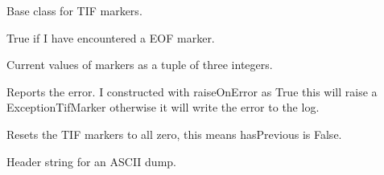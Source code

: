 \documentclass[letterpaper,10pt,english]{sphinxmanual}
\begin{document}
\begin{fulllineitems}
\label{\detokenize{ref/LIS/core/TifMarker:TotalDepth.LIS.core.TifMarker.TifMarkerBase}}
Base class for TIF markers.

\begin{fulllineitems}
\label{\detokenize{ref/LIS/core/TifMarker:TotalDepth.LIS.core.TifMarker.TifMarkerBase.eof}}
True if I have encountered a EOF marker.

\end{fulllineitems}


\begin{fulllineitems}
\label{\detokenize{ref/LIS/core/TifMarker:TotalDepth.LIS.core.TifMarker.TifMarkerBase.markers}}
Current values of markers as a tuple of three integers.

\end{fulllineitems}


\begin{fulllineitems}
\label{\detokenize{ref/LIS/core/TifMarker:TotalDepth.LIS.core.TifMarker.TifMarkerBase.reportError}}
Reports the error. I constructed with raiseOnError as True this will
raise a ExceptionTifMarker otherwise it will write the error to the log.

\end{fulllineitems}


\begin{fulllineitems}
\label{\detokenize{ref/LIS/core/TifMarker:TotalDepth.LIS.core.TifMarker.TifMarkerBase.reset}}
Resets the TIF markers to all zero, this means hasPrevious is False.

\end{fulllineitems}


\begin{fulllineitems}
\label{\detokenize{ref/LIS/core/TifMarker:TotalDepth.LIS.core.TifMarker.TifMarkerBase.strHeader}}
Header string for an ASCII dump.

\end{fulllineitems}


\end{fulllineitems}
\end{document}
